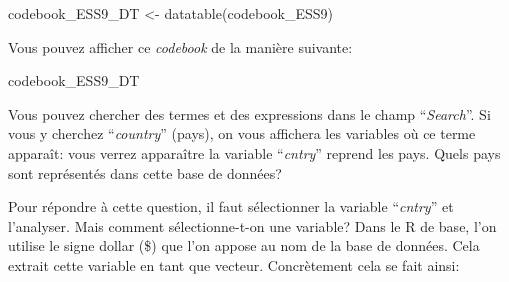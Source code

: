 \documentclass[
]{book}
\newenvironment{Shaded}{\begin{snugshade}}{\end{snugshade}}
\newcommand{\FunctionTok}[1]{\textcolor[rgb]{0.00,0.00,0.00}{#1}}
\newcommand{\NormalTok}[1]{#1}
\newcommand{\OtherTok}[1]{\textcolor[rgb]{0.56,0.35,0.01}{#1}}
\newcommand{\SpecialCharTok}[1]{\textcolor[rgb]{0.00,0.00,0.00}{#1}}
\begin{document}
\begin{Shaded}
\begin{Highlighting}[]
\NormalTok{codebook\_ESS9\_DT }\OtherTok{\textless{}{-}} \FunctionTok{datatable}\NormalTok{(codebook\_ESS9)}
\end{Highlighting}
\end{Shaded}

Vous pouvez afficher ce \emph{codebook} de la manière suivante:

\begin{Shaded}
\begin{Highlighting}[]
\NormalTok{codebook\_ESS9\_DT}
\end{Highlighting}
\end{Shaded}

Vous pouvez chercher des termes et des expressions dans le champ ``\emph{Search}''. Si vous y cherchez ``\emph{country}'' (pays), on vous affichera les variables où ce terme apparaît: vous verrez apparaître la variable ``\emph{cntry}'' reprend les pays. Quels pays sont représentés dans cette base de données?

Pour répondre à cette question, il faut sélectionner la variable ``\emph{cntry}'' et l'analyser. Mais comment sélectionne-t-on une variable? Dans le R de base, l'on utilise le signe dollar (\$) que l'on appose au nom de la base de données. Cela extrait cette variable en tant que vecteur. Concrètement cela se fait ainsi:

\begin{Shaded}
\end{Shaded}
\end{document}

